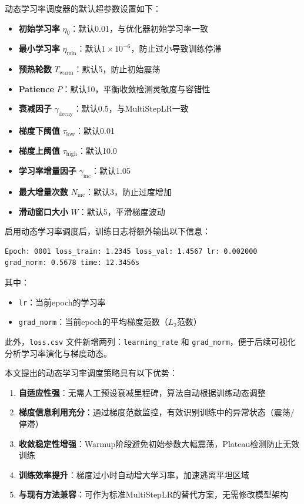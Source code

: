 \documentclass[UTF8, a4paper, 12pt]{article}
\begin{document}

动态学习率调度器的默认超参数设置如下：

\begin{itemize}
    \item \textbf{初始学习率} $\eta_0$：默认0.01，与优化器初始学习率一致
    \item \textbf{最小学习率} $\eta_{\text{min}}$：默认$1 \times 10^{-6}$，防止过小导致训练停滞
    \item \textbf{预热轮数} $T_{\text{warm}}$：默认5，防止初始震荡
    \item \textbf{Patience} $P$：默认10，平衡收敛检测灵敏度与容错性
    \item \textbf{衰减因子} $\gamma_{\text{decay}}$：默认0.5，与MultiStepLR一致
    \item \textbf{梯度下阈值} $\tau_{\text{low}}$：默认0.01
    \item \textbf{梯度上阈值} $\tau_{\text{high}}$：默认10.0
    \item \textbf{学习率增量因子} $\gamma_{\text{inc}}$：默认1.05
    \item \textbf{最大增量次数} $N_{\text{inc}}$：默认3，防止过度增加
    \item \textbf{滑动窗口大小} $W$：默认5，平滑梯度波动
\end{itemize}


启用动态学习率调度后，训练日志将额外输出以下信息：

\begin{verbatim}
Epoch: 0001 loss_train: 1.2345 loss_val: 1.4567 lr: 0.002000 grad_norm: 0.5678 time: 12.3456s
\end{verbatim}

其中：
\begin{itemize}
    \item \texttt{lr}：当前epoch的学习率
    \item \texttt{grad\_norm}：当前epoch的平均梯度范数（$L_2$范数）
\end{itemize}

此外，\texttt{loss.csv} 文件新增两列：\texttt{learning\_rate} 和 \texttt{grad\_norm}，便于后续可视化分析学习率演化与梯度动态。


本文提出的动态学习率调度策略具有以下优势：

\begin{enumerate}
    \item \textbf{自适应性强}：无需人工预设衰减里程碑，算法自动根据训练动态调整
    \item \textbf{梯度信息利用充分}：通过梯度范数监控，有效识别训练中的异常状态（震荡/停滞）
    \item \textbf{收敛稳定性增强}：Warmup阶段避免初始参数大幅震荡，Plateau检测防止无效训练
    \item \textbf{训练效率提升}：梯度过小时自动增大学习率，加速逃离平坦区域
    \item \textbf{与现有方法兼容}：可作为标准MultiStepLR的替代方案，无需修改模型架构
\end{enumerate}
\end{document}
